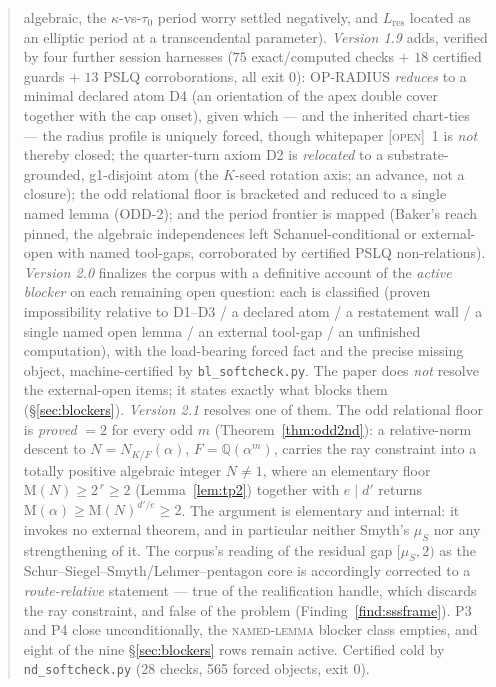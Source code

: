 \documentclass[11pt]{article}
\newcommand{\tagO}{\textcolor{cO}{\textsc{[open]}}}
\newcommand{\Q}{\mathbb{Q}}
\newcommand{\M}{\mathrm{M}}
\theoremstyle{plain}
\theoremstyle{definition}
\theoremstyle{remark}
\begin{document}
\begin{abstract}
algebraic, the $\kappa$-vs-$\tau_0$ period worry settled negatively, and
$L_{\mathrm{res}}$ located as an elliptic period at a transcendental parameter).
\emph{Version 1.9} adds, verified by four further session harnesses ($75$
exact/computed checks $+$ $18$ certified guards $+$ $13$ PSLQ corroborations, all
exit 0): OP-RADIUS \emph{reduces} to a minimal declared atom D4 (an orientation
of the apex double cover together with the cap onset), given which --- and the
inherited chart-ties --- the radius profile is uniquely forced, though whitepaper
\tagO{}~1 is \emph{not} thereby closed; the quarter-turn axiom D2 is
\emph{relocated} to a substrate-grounded, g1-disjoint atom (the $K$-seed rotation
axis; an advance, not a closure); the odd relational floor is bracketed and
reduced to a single named lemma (ODD-2); and the period frontier is mapped
(Baker's reach pinned, the algebraic independences left Schanuel-conditional or
external-open with named tool-gaps, corroborated by certified PSLQ non-relations).
\emph{Version 2.0} finalizes the corpus with a definitive account of the
\emph{active blocker} on each remaining open question: each is classified
(proven impossibility relative to D1--D3 / a declared atom / a restatement wall
/ a single named open lemma / an external tool-gap / an unfinished computation),
with the load-bearing forced fact and the precise missing object, machine-certified
by \texttt{bl\_softcheck.py}. The paper does \emph{not} resolve the external-open
items; it states exactly what blocks them (\S\ref{sec:blockers}).
\emph{Version 2.1} resolves one of them. The odd relational floor is
\emph{proved} $=2$ for every odd $m$ (Theorem~\ref{thm:odd2nd}): a relative-norm
descent to $N=N_{K/F}(\alpha)$, $F=\Q(\alpha^m)$, carries the ray constraint into
a totally positive algebraic integer $N\neq1$, where an elementary floor
$\M(N)\ge2^{\,r}\ge2$ (Lemma~\ref{lem:tp2}) together with $e\mid d'$ returns
$\M(\alpha)\ge\M(N)^{d'/e}\ge2$. The argument is elementary and internal: it
invokes no external theorem, and in particular neither Smyth's $\mu_S$ nor any
strengthening of it. The corpus's reading of the residual gap $[\mu_S,2)$ as the
Schur--Siegel--Smyth/Lehmer--pentagon core is accordingly corrected to a
\emph{route-relative} statement --- true of the realification handle, which
discards the ray constraint, and false of the problem
(Finding~\ref{find:sssframe}). P3 and P4 close unconditionally, the
\textsc{named-lemma} blocker class empties, and eight of the nine
\S\ref{sec:blockers} rows remain active. Certified cold by
\texttt{nd\_softcheck.py} (28 checks, 565 forced objects, exit 0).

\end{abstract}
\end{document}
